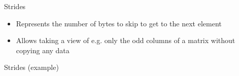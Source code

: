 \documentclass[utf8x,xcolor=pdftex,dvipsnames,table]{beamer}
\begin{document}
\begin{frame}{Strides}
\begin{itemize}
\item Represents the number of bytes to skip to get to the next element
\item Allows taking a view of e.g. only the odd columns of a matrix without copying any data
\end{itemize}
\end{frame}
\begin{frame}{Strides (example)}
\begin{center}
\hspace{5em}
\end{center}
\begin{center}

\end{center}
\end{frame}
\end{document}
